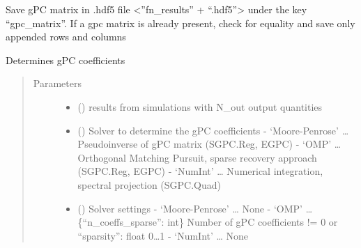 \documentclass[letterpaper,10pt,english,openany,oneside]{sphinxmanual}
\begin{document}
\begin{fulllineitems}

\begin{fulllineitems}
\label{\detokenize{pygpc:pygpc.GPC.GPC.save_gpc_matrix_hdf5}}
Save gPC matrix in .hdf5 file \textless{}”fn\_results” + “.hdf5”\textgreater{} under the key “gpc\_matrix”.
If a gpc matrix is already present, check for equality and save only appended rows and columns

\end{fulllineitems}


\begin{fulllineitems}
\label{\detokenize{pygpc:pygpc.GPC.GPC.solve}}
Determines gPC coefficients
\begin{quote}\begin{description}
\item[{Parameters}] \leavevmode\begin{itemize}
\item {} 
 (\sphinxstyleliteralemphasis{\sphinxupquote{{[}}}\sphinxstyleliteralemphasis{\sphinxupquote{{]} }}) \textendash{} results from simulations with N\_out output quantities

\item {} 
 () \textendash{} Solver to determine the gPC coefficients
- ‘Moore-Penrose’ … Pseudoinverse of gPC matrix (SGPC.Reg, EGPC)
- ‘OMP’ … Orthogonal Matching Pursuit, sparse recovery approach (SGPC.Reg, EGPC)
- ‘NumInt’ … Numerical integration, spectral projection (SGPC.Quad)

\item {} 
 () \textendash{} Solver settings
- ‘Moore-Penrose’ … None
- ‘OMP’ … \{“n\_coeffs\_sparse”: int\} Number of gPC coefficients != 0 or “sparsity”: float 0…1
- ‘NumInt’ … None


\end{itemize}
\end{description}
\end{quote}
\end{fulllineitems}
\end{fulllineitems}
\end{document}
